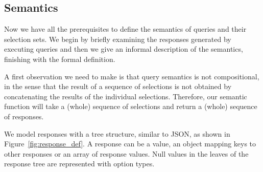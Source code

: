 






\subsection{Semantics}\label{subsec:semantics}
Now we have all the prerequisites to define the semantics of \gql queries and their selection sets. We begin by briefly examining the responses generated by executing queries and then we give an informal description of the semantics, finishing with the formal definition. %

A first observation we need to make is that query semantics is not compositional, in the sense that the result of a sequence of selections is not obtained by concatenating the results of the individual selections. Therefore, our semantic function will take a (whole) sequence of selections and return a (whole) sequence of responses.  

We model responses with a tree structure, similar to JSON, as shown in Figure~\ref{fig:response_def}. A response can be a value, an object mapping keys to other responses or an array of response values. Null values in the leaves of the response tree are represented with option types.%

